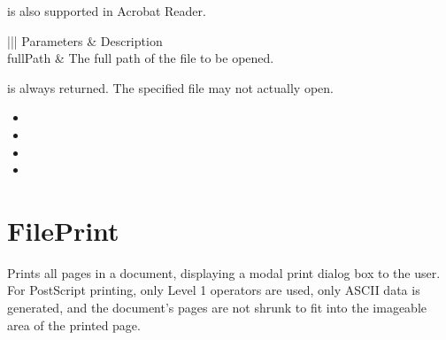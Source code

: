 \documentclass[letterpaper,12pt,english,openany,oneside]{sphinxmanual}
\begin{document}
 is also supported in Acrobat Reader.


\begin{sphinxVerbatim}[commandchars=\\\{\}]
\PYG{p}{[} \PYG{p}{]}
\end{sphinxVerbatim}
\label{\detokenize{IAC_API_DDE_Messages:parameters-19}}


\begin{savenotes}\sphinxattablestart
\centering
{}\label{\detokenize{IAC_API_DDE_Messages:section-19}}\nobreak
\begin{tabular}[t]{|||}
\hline
\sphinxstyletheadfamily 
Parameters
&\sphinxstyletheadfamily 
Description
\\
\hline
fullPath
&
The full path of the file to be opened.
\\
\hline
\end{tabular}
\par
\sphinxattableend\end{savenotes}


 is always returned. The specified file may not actually open.

\label{\detokenize{IAC_API_DDE_Messages:related-methods-19}}
\begin{itemize}
\item {} 

\item {} 

\item {} 

\item {} 

\end{itemize}




\section{FilePrint}
\label{\detokenize{IAC_API_DDE_Messages:id38}}
Prints all pages in a document, displaying a modal print dialog box to the user. For PostScript printing, only Level 1 operators are used, only ASCII data is generated, and the document’s pages are not shrunk to fit into the imageable area of the printed page.
\end{document}
